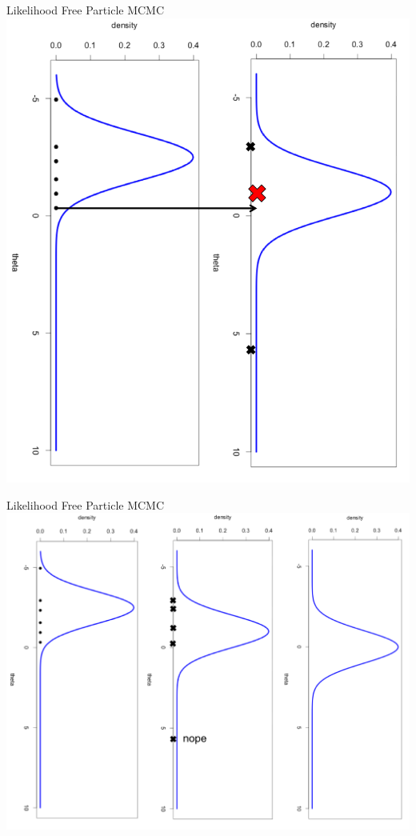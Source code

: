 \documentclass[12pt,a4paper,t,xcolor=dvipsnames,slidestop,compress,mathserif]{beamer}
\begin{document}
\begin{frame}{Likelihood Free Particle MCMC}
\includegraphics[scale=0.35]{post_sample4_graphic.png}
\end{frame}
\begin{frame}{Likelihood Free Particle MCMC}
\includegraphics[scale=0.35]{post_sample5_graphic.png}
\end{frame}
\end{document}
